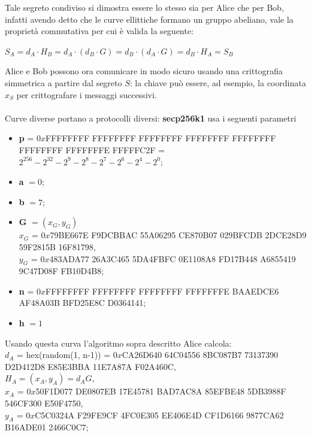 \documentclass[a4paper,12pt]{tesiinfo}
\begin{document}
Tale segreto condiviso si dimostra essere lo stesso sia per Alice che per Bob, infatti avendo detto che le curve ellittiche formano un gruppo abeliano, vale la propriet\`a commutativa per cui \`e valida la seguente:
\begin{center}
    $S_A = d_A \cdot H_B = d_A \cdot (d_B \cdot G) = d_B \cdot (d_A \cdot G) = d_B \cdot H_A = S_B$
\end{center}
Alice e Bob possono ora comunicare in modo sicuro usando una crittografia simmetrica a partire dal segreto $S$: la chiave pu\`o essere, ad esempio, la coordinata $x_S$ per crittografare i messaggi successivi.
\\
\\
Curve diverse portano a protocolli diversi: \textbf{secp256k1} usa i seguenti parametri 
\begin{itemize}
    \item \textbf{p} = $0x$FFFFFFFF FFFFFFFF FFFFFFFF FFFFFFFF FFFFFFFF FFFFFFFF FFFFFFFE FFFFFC2F = $2^{256} - 2^{32}-2^9-2^8-2^7-2^6-2^4-2^0$;
    
    \item \textbf{a} $=0$;
    
    \item \textbf{b} $=7$;
    
    \item \textbf{G} $= (x_G, y_G)$
    \\
    $x_G$ = $0x$79BE667E F9DCBBAC 55A06295 CE870B07 029BFCDB 2DCE28D9 59F2815B 16F81798,
    \\
    $y_G$ = $0x$483ADA77 26A3C465 5DA4FBFC 0E1108A8 FD17B448 A6855419 9C47D08F FB10D4B8;
    
    \item \textbf{n} = $0x$FFFFFFFF FFFFFFFF FFFFFFFF FFFFFFFE BAAEDCE6 AF48A03B BFD25E8C D0364141;
    
    \item \textbf{h} $ = 1$
\end{itemize}
Usando questa curva l'algoritmo sopra descritto Alice calcola:\\
$d_A$ = hex(random(1, n-1)) = $0x$CA26D640 64C04556 8BC087B7 73137390 D2D412D8 E85E3BBA 11E7A87A F02A460C,\\
$H_A = (x_A, y_A) = d_AG$,\\
$x_A$ = $0x$50F1D077 DE0807EB 17E45781 BAD7AC8A 85EFBE48 5DB3988F 546CF300 E50F4750,\\
$y_A$ = $0x$C5C0324A F29FE9CF 4FC0E305 EE406E4D CF1D6166 9877CA62 B16ADE01 2466C0C7;\\
\\
\end{document}
